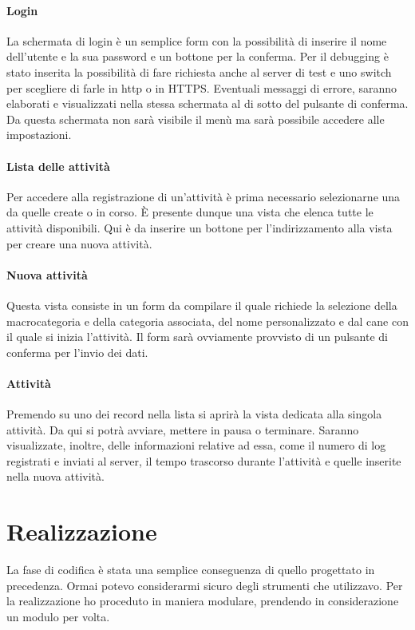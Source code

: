 \paragraph{Login}
La schermata di login è un semplice form con la possibilità di inserire il nome dell'utente e la sua password e un
bottone per la conferma. Per il debugging è stato inserita la possibilità di fare richiesta anche al server di test e
uno switch per scegliere di farle in \acrshort{http} o in HTTPS. Eventuali messaggi di errore, saranno elaborati e
visualizzati nella stessa schermata al di sotto del pulsante di conferma. Da questa schermata non sarà visibile il menù
ma sarà possibile accedere alle impostazioni.

\paragraph{Lista delle attività}
Per accedere alla registrazione di un'attività è prima necessario selezionarne una da quelle create o in corso. È
presente dunque una vista che elenca tutte le attività disponibili. Qui è da inserire un bottone per l'indirizzamento
alla vista per creare una nuova attività. 

\paragraph{Nuova attività}
Questa vista consiste in un form da compilare il quale richiede la selezione della macrocategoria e della categoria
associata, del nome personalizzato e dal cane con il quale si inizia l'attività. Il form sarà ovviamente provvisto di un
pulsante di conferma per l'invio dei dati.

\paragraph{Attività}
Premendo su uno dei record nella lista si aprirà la vista dedicata alla singola attività. Da qui si potrà avviare,
mettere in pausa o terminare. Saranno visualizzate, inoltre, delle informazioni relative ad essa, come il numero di log
registrati e inviati al server, il tempo trascorso durante l'attività e quelle inserite nella nuova attività.

\section{Realizzazione}

La fase di codifica è stata una semplice conseguenza di quello progettato in precedenza. Ormai potevo considerarmi
sicuro degli strumenti che utilizzavo. Per la realizzazione ho proceduto in maniera modulare, prendendo in
considerazione un modulo per volta.

